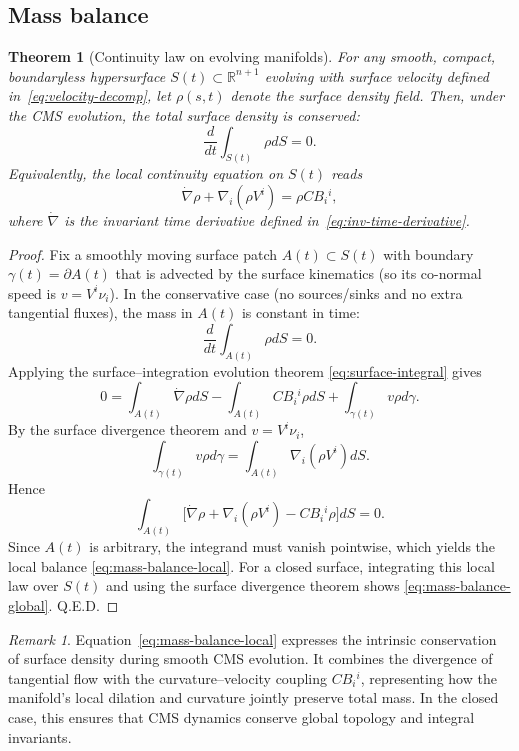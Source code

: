 \documentclass[11pt]{article}
\theoremstyle{definition}
\theoremstyle{plain}
\newtheorem{theorem}[definition]{Theorem}
\theoremstyle{remark}
\newtheorem{remark}[definition]{Remark}
\begin{document}
\subsection{Mass balance}\label{subsec:mass-balance}

\begin{theorem}[Continuity law on evolving manifolds]\label{thm:mass-balance}
For any smooth, compact, boundaryless hypersurface $S(t)\subset\mathbb{R}^{n+1}$ evolving with surface velocity defined in~\eqref{eq:velocity-decomp}, let $\rho (s,t)$ denote the surface density field.  
Then, under the CMS evolution, the total surface density is conserved:
\begin{equation}\label{eq:mass-balance-global}
\frac{d}{dt}\int_{S(t)}\rho dS = 0.
\end{equation}
Equivalently, the local continuity equation on $S(t)$ reads
\begin{equation}\label{eq:mass-balance-local}
\dot{\nabla}\rho+ \nabla_i (\rho V^i) =\rho C B_i{}^{i},
\end{equation}
where $\dot{\nabla}$ is the invariant time derivative defined in~\eqref{eq:inv-time-derivative}.
\end{theorem}

\begin{proof}
Fix a smoothly moving surface patch $A(t)\subset S(t)$ with boundary $\gamma(t)=\partial A(t)$ that is advected by the surface kinematics (so its co-normal speed is $v=V^i\nu_i$). In the conservative case (no sources/sinks and no extra tangential fluxes), the mass in $A(t)$ is constant in time:
\[
\frac{d}{dt}\int_{A(t)} \rho dS = 0.
\]
Applying the surface–integration evolution theorem \eqref{eq:surface-integral} gives
\[
0 = \int_{A(t)} \dot{\nabla}\rho dS - \int_{A(t)} CB_i{}^{i}\rho dS + \int_{\gamma(t)} v \rho d\gamma .
\]
By the surface divergence theorem and $v=V^i\nu_i$,
\[
\int_{\gamma(t)} v \rho d\gamma = \int_{A(t)} \nabla_i(\rho V^i)dS .
\]
Hence
\[
\int_{A(t)} \bigl[\dot{\nabla}\rho + \nabla_i(\rho V^i) - C B_i{}^{i}\rho \bigr] dS = 0 .
\]
Since $A(t)$ is arbitrary, the integrand must vanish pointwise, which yields the local balance \eqref{eq:mass-balance-local}. For a closed surface, integrating this local law over $S(t)$ and using the surface divergence theorem shows \eqref{eq:mass-balance-global}. Q.E.D.
\end{proof}

\begin{remark}
Equation~\eqref{eq:mass-balance-local} expresses the intrinsic conservation of surface density during smooth CMS evolution.  
It combines the divergence of tangential flow with the curvature–velocity coupling $C B_i{}^{i}$, representing how the manifold’s local dilation and curvature jointly preserve total mass.  
In the closed case, this ensures that CMS dynamics conserve global topology and integral invariants.
\end{remark}
\end{document}
